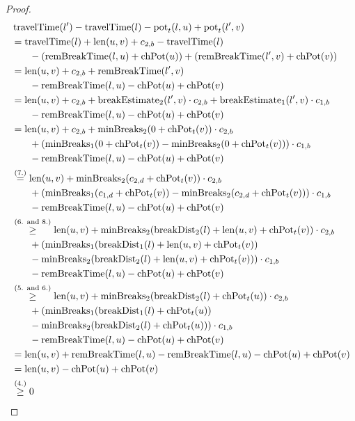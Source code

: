 \begin{proof}
	\begin{align}
		\begin{split}\label{eq:label_n_feasibility_proof_3}
			&\concretett(l') - \concretett(l) - \concretepotential_t(l,u) + \concretepotential_t(l',v)\\
			&= \concretett(l) + \len(u,v) + \restr_{2,b} - \concretett(l)\\
			& \phantom{{}=1} - (\remBreak(l,u) + \chpotential(u)) + (\remBreak(l',v) + \chpotential(v))\\
			&= \len(u,v) + \restr_{2,b} + \remBreak(l',v)\\
			& \phantom{{}=1} - \remBreak(l,u) - \chpotential(u)  + \chpotential(v)\\
			&= \len(u,v) + \restr_{2,b} + \breakEstimate_2(l',v) \cdot \restr_{2,b} + \breakEstimate_1(l',v) \cdot \restr_{1,b}\\
			& \phantom{{}=1} - \remBreak(l,u) - \chpotential(u)  + \chpotential(v)\\
			&= \len(u,v) + \restr_{2,b} + \minBreaks_2(0 + \chpotential_t(v)) \cdot \restr_{2,b}\\
			& \phantom{{}=1} + (\minBreaks_1(0 + \chpotential_t(v)) - \minBreaks_2(0 + \chpotential_t(v))) \cdot \restr_{1,b}\\
			& \phantom{{}=1} - \remBreak(l,u) - \chpotential(u) + \chpotential(v)\\
			&\stackrel{\text{(7.)}}{=} \len(u,v) + \minBreaks_2(\restr_{2,d}  + \chpotential_t(v)) \cdot \restr_{2,b}\\
			& \phantom{{}=1} + (\minBreaks_1(\restr_{1,d}  + \chpotential_t(v)) - \minBreaks_2(\restr_{2,d} + \chpotential_t(v))) \cdot \restr_{1,b}\\
			& \phantom{{}=1} - \remBreak(l,u) - \chpotential(u) + \chpotential(v)\\
			&\stackrel{\text{(6. and 8.)}}{\ge} \len(u,v) + \minBreaks_2(\breakDist_2(l) + \len(u,v) + \chpotential_t(v)) \cdot \restr_{2,b}\\
			& \phantom{{}=1} + (\minBreaks_1(\breakDist_1(l) + \len(u,v) + \chpotential_t(v))\\
			& \phantom{{}=1} - \minBreaks_{2}(\breakDist_2(l) + \len(u,v) +\chpotential_t(v))) \cdot \restr_{1,b} \\
			& \phantom{{}=1} - \remBreak(l,u) - \chpotential(u) + \chpotential(v)\\
			&\stackrel{\text{(5. and 6.)}}{\ge} \len(u,v)  + \minBreaks_2(\breakDist_2(l) + \chpotential_t(u)) \cdot \restr_{2,b}\\
			& \phantom{{}=1} + (\minBreaks_1(\breakDist_1(l) + \chpotential_t(u))\\
			& \phantom{{}=1} - \minBreaks_2(\breakDist_2(l) + \chpotential_t(u))) \cdot \restr_{1,b}\\
			& \phantom{{}=1} - \remBreak(l,u) - \chpotential(u) + \chpotential(v)\\
			&= \len(u,v) +  \remBreak(l,u) - \remBreak(l,u) - \chpotential(u) + \chpotential(v)\\
			&= \len(u,v) - \chpotential(u) + \chpotential(v)\\
			&\stackrel{\text{(4.)}}{\ge} 0
		\end{split}
	\end{align}


\end{proof}
